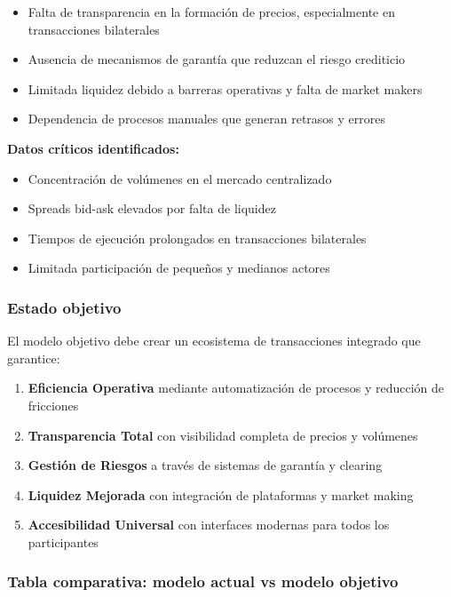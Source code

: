 \documentclass{cel}
\begin{document}
\begin{itemize}
\item Falta de transparencia en la formación de precios, especialmente en transacciones bilaterales
\item Ausencia de mecanismos de garantía que reduzcan el riesgo crediticio
\item Limitada liquidez debido a barreras operativas y falta de market makers
\item Dependencia de procesos manuales que generan retrasos y errores

\end{itemize}
\textbf{Datos críticos identificados:}


\begin{itemize}
\item Concentración de volúmenes en el mercado centralizado
\item Spreads bid-ask elevados por falta de liquidez
\item Tiempos de ejecución prolongados en transacciones bilaterales
\item Limitada participación de pequeños y medianos actores

\end{itemize}
\subsubsection{Estado objetivo}
\nopagebreak

El modelo objetivo debe crear un ecosistema de transacciones integrado que garantice:


\begin{enumerate}
\item \textbf{Eficiencia Operativa} mediante automatización de procesos y reducción de fricciones
\item \textbf{Transparencia Total} con visibilidad completa de precios y volúmenes
\item \textbf{Gestión de Riesgos} a través de sistemas de garantía y clearing
\item \textbf{Liquidez Mejorada} con integración de plataformas y market making
\item \textbf{Accesibilidad Universal} con interfaces modernas para todos los participantes

\end{enumerate}
\vspace{0.4cm}
\subsubsection{Tabla comparativa: modelo actual vs modelo objetivo}
\nopagebreak
\end{document}
